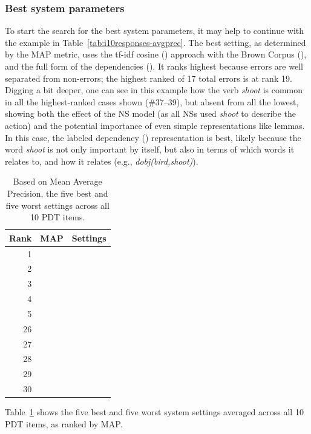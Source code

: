\subsubsection{Best system parameters} 

To start the search for the best system parameters, it may help to
continue with the example in
Table~\ref{tab:i10responses-avgprec}. The best setting, as determined by the
MAP metric, uses the tf-idf cosine () approach with the Brown Corpus (), and the full form of the dependencies (). It ranks highest because errors are
well separated from non-errors; the highest ranked of 17 total errors
is at rank 19.  Digging a bit deeper, one can see in this example how
the verb \textit{shoot} is common in all the highest-ranked cases shown
(\#37--39), but absent from all the lowest, showing both the effect of
the NS model (as all NSs used \textit{shoot} to describe the action) and the
potential importance of even simple representations like lemmas.  In
this case, the labeled dependency () representation is best, likely because the
word \textit{shoot} is not only important by itself, but also in terms
of which words it relates to, and how it relates (e.g.,
\textit{dobj(bird,shoot)}).

\begin{table}[htb!]
\begin{center}
\begin{tabular}{|r|l|c|}
\hline
Rank & MAP & Settings \\
\hline
\hline
1 &  &  \\
\hline
2 &  &  \\
\hline
3 &  &  \\
\hline
4 &  &  \\
\hline
5 &  &  \\
\hline
\hline
26 &  &  \\
\hline
27 &  &  \\
\hline
28 &  &  \\
\hline
29 &  &  \\
\hline
30 &  &  \\
\hline
\end{tabular}
\caption{Based on Mean Average Precision, the five best and five worst settings across all 10 PDT items.}
\label{tab:all-dist-ranked-settings}
\end{center}
\end{table}

Table~\ref{tab:all-dist-ranked-settings} shows the five best and five
worst system settings averaged across all 10 PDT items, as ranked by
MAP.

